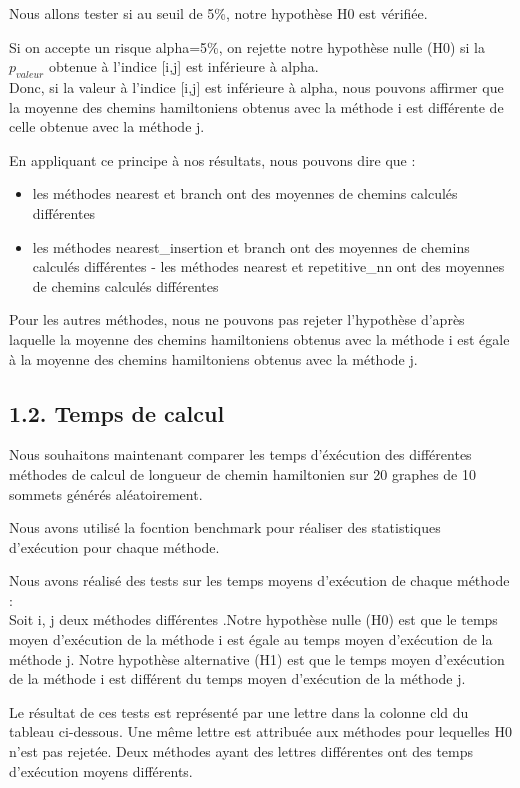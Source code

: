 \documentclass[
]{article}
\providecommand{\tightlist}{%
  \setlength{\itemsep}{0pt}\setlength{\parskip}{0pt}}
\begin{document}
Nous allons tester si au seuil de 5\%, notre hypothèse H0 est vérifiée.

Si on accepte un risque alpha=5\%, on rejette notre hypothèse nulle (H0)
si la \(p_{valeur}\) obtenue à l'indice {[}i,j{]} est inférieure à
alpha.\\
Donc, si la valeur à l'indice {[}i,j{]} est inférieure à alpha, nous
pouvons affirmer que la moyenne des chemins hamiltoniens obtenus avec la
méthode i est différente de celle obtenue avec la méthode j.

En appliquant ce principe à nos résultats, nous pouvons dire que :

\begin{itemize}
\tightlist
\item
  les méthodes nearest et branch ont des moyennes de chemins calculés
  différentes
\item
  les méthodes nearest\_insertion et branch ont des moyennes de chemins
  calculés différentes - les méthodes nearest et repetitive\_nn ont des
  moyennes de chemins calculés différentes
\end{itemize}

Pour les autres méthodes, nous ne pouvons pas rejeter l'hypothèse
d'après laquelle la moyenne des chemins hamiltoniens obtenus avec la
méthode i est égale à la moyenne des chemins hamiltoniens obtenus avec
la méthode j.

\hypertarget{temps-de-calcul}{%
\subsection{1.2. Temps de calcul}\label{temps-de-calcul}}

Nous souhaitons maintenant comparer les temps d'éxécution des
différentes méthodes de calcul de longueur de chemin hamiltonien sur 20
graphes de 10 sommets générés aléatoirement.

Nous avons utilisé la focntion benchmark pour réaliser des statistiques
d'exécution pour chaque méthode.

Nous avons réalisé des tests sur les temps moyens d'exécution de chaque
méthode :\\
Soit i, j deux méthodes différentes .Notre hypothèse nulle (H0) est que
le temps moyen d'exécution de la méthode i est égale au temps moyen
d'exécution de la méthode j. Notre hypothèse alternative (H1) est que le
temps moyen d'exécution de la méthode i est différent du temps moyen
d'exécution de la méthode j.

Le résultat de ces tests est représenté par une lettre dans la colonne
cld du tableau ci-dessous. Une même lettre est attribuée aux méthodes
pour lequelles H0 n'est pas rejetée. Deux méthodes ayant des lettres
différentes ont des temps d'exécution moyens différents.
\end{document}
